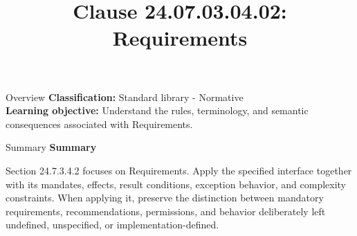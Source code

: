 \documentclass[10pt,letterpaper]{article}
\title{Clause 24.07.03.04.02: Requirements}
\author{}
\date{}
\begin{document}
\maketitle
\begin{CornellOverviewBox}{Overview}
\textbf{Classification:} Standard library - Normative\\[2pt]
\textbf{Learning objective:} Understand the rules, terminology, and semantic consequences associated with Requirements.
\end{CornellOverviewBox}\begin{CornellSummaryBox}{Summary}
{\sffamily\bfseries\color{Accent} Summary}\par\vspace{3pt}Section 24.7.3.4.2 focuses on Requirements. Apply the specified interface together with its mandates, effects, result conditions, exception behavior, and complexity constraints. When applying it, preserve the distinction between mandatory requirements, recommendations, permissions, and behavior deliberately left undefined, unspecified, or implementation-defined.
\end{CornellSummaryBox}
\end{document}
